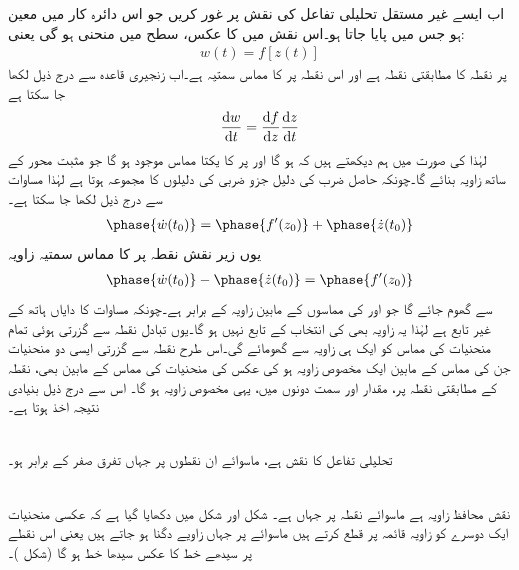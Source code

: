 اب ایسے غیر مستقل تحلیلی تفاعل  کی نقش پر غور کریں جو اس دائرہ کار میں معین ہو جس میں  پایا جاتا ہو۔اس نقش میں  کا عکس،  سطح  میں منحنی  ہو گی یعنی:
\begin{align*}
w(t)=f[z(t)]
\end{align*}
 پر نقطہ  کا مطابقتی نقطہ  ہے اور  اس نقطہ پر  کا  مماس سمتیہ ہے۔اب زنجیری قاعدہ سے درج ذیل لکھا جا سکتا ہے
\begin{align}\label{مساوات_نقش_عمومی_منحنی_پ}
\frac{\dif w}{\dif t}=\frac{\dif f}{\dif z}\frac{\dif z}{\dif t}
\end{align}
لہٰذا  کی صورت میں ہم دیکھتے ہیں کہ  ہو گا اور  پر  کا یکتا مماس موجود ہو گا جو مثبت  محور   کے ساتھ  زاویہ بنائے گا۔چونکہ حاصل ضرب کی دلیل جزو ضربی کی  دلیلوں  کا مجموعہ ہوتا ہے لہٰذا مساوات  سے درج ذیل لکھا جا سکتا ہے۔
\begin{align*}
\phase{\dot{w}(t_0)}=\phase{f'(z_0)}+\phase{\dot{z}(t_0)}
\end{align*}
یوں زیر نقش نقطہ  پر  کا مماس سمتیہ  زاویہ
\begin{align}\label{مساوات_نقش_عمومی_منحنی_ت}
\phase{\dot{w}(t_0)}-\phase{\dot{z}(t_0)}=\phase{f'(z_0)}
\end{align}
سے گھوم جائے گا جو  اور  کی  مماسوں کے مابین زاویہ کے برابر ہے۔چونکہ مساوات  کا دایاں ہاتھ  کے غیر تابع ہے لہٰذا یہ زاویہ بھی  کی انتخاب کے تابع نہیں ہو گا۔یوں تبادل  نقطہ  سے گزرتی ہوئی تمام منحنیات کی مماس کو ایک ہی زاویہ  سے گھومائے گی۔اس طرح نقطہ  سے گزرتی ایسی دو منحنیات جن کی مماس کے مابین ایک مخصوص زاویہ ہو کی عکس کی منحنیات کی مماس کے مابین بھی، نقطہ  کے مطابقتی نقطہ  پر، مقدار اور سمت دونوں میں، یہی مخصوص زاویہ ہو گا۔ اس سے درج ذیل بنیادی نتیجہ اخذ ہوتا ہے۔

\quad {}\\
تحلیلی تفاعل  کا نقش  ہے، ماسوائے ان نقطوں پر جہاں تفرق  صفر کے برابر ہو۔ 

\quad {}\\
نقش  محافظ زاویہ ہے ماسوائے نقطہ  پر جہاں  ہے۔ شکل  اور شکل  میں دکھایا گیا ہے کہ عکسی منحنیات ایک دوسرے کو زاویہ قائمہ پر قطع کرتے ہیں ماسوائے  پر جہاں زاویے دگنا ہو جاتے ہیں یعنی اس نقطے پر سیدھے خط  کا عکس سیدھا خط  ہو گا (شکل )۔ 

